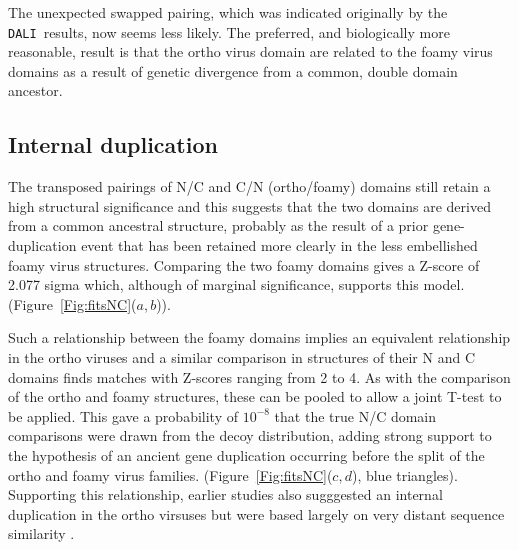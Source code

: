 \documentclass[12pt]{article}
\newcommand{\Fig}[1]{Figure~\ref{Fig:#1}}
\newcommand{\3}{$3_{10}$}
\newcommand{\DALI}{{\tt DALI}}
\begin{document}
The unexpected swapped pairing, which was indicated originally by the \DALI\ results, now seems
less likely.  The preferred, and biologically more reasonable, result is that the ortho virus
domain are related to the foamy virus domains as a result of genetic divergence from
a common, double domain ancestor. 

%
%
%
%

\subsection{Internal duplication}

The transposed pairings of N/C and C/N (ortho/foamy) domains still retain a high structural
significance and this suggests that the two domains are derived from a common ancestral structure,
probably as the result of a prior gene-duplication event that has been retained more clearly
in the less embellished foamy virus structures.   Comparing the two foamy domains gives
a Z-score of 2.077 sigma which, although of marginal significance, supports this model.
(\Fig{fitsNC}($a,b$)).

Such a relationship between the foamy domains implies an equivalent relationship
in the ortho viruses and a similar comparison in structures of their N and C domains
finds matches with Z-scores ranging from 2 to 4.   As with the comparison of the 
ortho and foamy structures, these can be pooled to allow a joint T-test to be applied.  
This gave a probability of $10^{-8}$ that the true N/C domain
comparisons were drawn from the decoy distribution, adding strong support to the
hypothesis of an ancient gene duplication occurring before the split of the ortho 
and foamy virus families. (\Fig{fitsNC}($c,d$), blue triangles).
Supporting this relationship, earlier studies also sugggested an internal duplication
in the ortho virsuses but were based largely on very distant sequence similarity 
\cite{CampillosMet06}.
\end{document}
